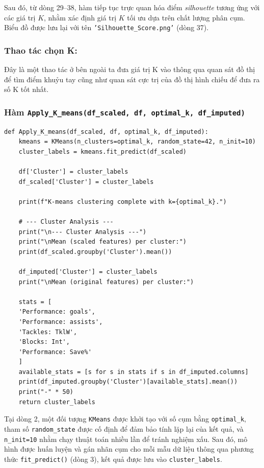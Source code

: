\documentclass[12pt]{report}
\begin{document}
{Sau đó, từ dòng 29–38, hàm tiếp tục trực quan hóa điểm \textit{silhouette} tương ứng với các giá trị $K$, nhằm xác định giá trị $K$ tối ưu dựa trên chất lượng phân cụm. Biểu đồ được lưu lại với tên \texttt{'Silhouette\_Score.png'} (dòng 37).
\\
\subsubsection{Thao tác chọn K:} Đây là một thao tác ở bên ngoài ta đưa giá trị K vào thông qua quan sát đồ thị để tìm điểm khuỷu tay cũng như quan sát cực trị của đồ thị hình chiếu để đưa ra số K tốt nhất.
\\
\subsubsection{Hàm \texttt{Apply\_K\_means(df\_scaled, df, optimal\_k, df\_imputed)}}
\begin{lstlisting}
def Apply_K_means(df_scaled, df, optimal_k, df_imputed):
    kmeans = KMeans(n_clusters=optimal_k, random_state=42, n_init=10)
    cluster_labels = kmeans.fit_predict(df_scaled)

    df['Cluster'] = cluster_labels
    df_scaled['Cluster'] = cluster_labels

    print(f"K-means clustering complete with k={optimal_k}.")

    # --- Cluster Analysis ---
    print("\n--- Cluster Analysis ---")
    print("\nMean (scaled features) per cluster:")
    print(df_scaled.groupby('Cluster').mean())

    df_imputed['Cluster'] = cluster_labels
    print("\nMean (original features) per cluster:")

    stats = [
    'Performance: goals', 
    'Performance: assists', 
    'Tackles: TklW',
    'Blocks: Int',
    'Performance: Save%'
    ]
    available_stats = [s for s in stats if s in df_imputed.columns]
    print(df_imputed.groupby('Cluster')[available_stats].mean())
    print("-" * 50)
    return cluster_labels
\end{lstlisting}
Tại dòng 2, một đối tượng \texttt{KMeans} được khởi tạo với số cụm bằng \texttt{optimal\_k}, tham số \texttt{random\_state} được cố định để đảm bảo tính lặp lại của kết quả, và \texttt{n\_init=10} nhằm chạy thuật toán nhiều lần để tránh nghiệm xấu. Sau đó, mô hình được huấn luyện và gán nhãn cụm cho mỗi mẫu dữ liệu thông qua phương thức \texttt{fit\_predict()} (dòng 3), kết quả được lưu vào \texttt{cluster\_labels}.

}
\end{document}
